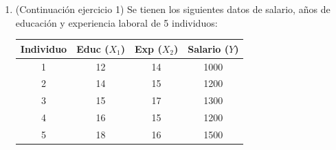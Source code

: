 \documentclass[10pt,a4paper]{article}
\begin{document}
\begin{enumerate}
    
$$\hat{colgpa} =1,392 -0,0135 hsperc + 0,0014 sat$$

Con $R^2=0,273$ y donde $colgpa$ es el promedio de las calificaciones de los estudiantes universitarios,
$hsperc$ es el percentil en la clase de educación media en la que se graduó (definida de manera que, por
ejemplo, $hsperc= 5$ significa el 5\% superior de su clase), y $sat$ son los puntajes combinados en
matemáticas y habilidades verbales en la prueba de admisión universitaria de los alumnos.
\begin{enumerate} 
\item (8 puntos) ¿Por qué es lógico que el coeficiente en $hsperc$ sea negativo?


\item  (8 puntos) ¿Cual es el promedio de calificaciones universitarias predicho cuando $hsperc= 20$ y $sat=900$?




\item (10 puntos) Suponga que dos estudiantes, A y B, se graduaron en el mismo percentil de la enseñanza media, pero el puntaje $sat$ del estudiante A es 140 puntos más alto. ¿Cuál es la diferencia predicha en el promedio
de calificaciones universitarias para estos dos alumnos? 



\item (10 puntos) Determine el $R^2$ ajustado ($\Bar{R^2}$) de la regresión. Compárelo con el $R^2$ y explique.



\item (20 puntos) Considerando que:

\[(X^\top X)^{-1} =
\begin{bmatrix}
8,5 & 0,19 & -0,11 \\
0,19 & 0,5 & -0,02 \\
-0,11 & -0,02 & 0,04 \\
\end{bmatrix}
\]

$$ \sum_{i=1}^{n} (y_i - \bar{y})^2=6.800$$
Determine la varianza de los estimadores de la regresión MCO.


\end{enumerate}


\item (Continuación ejercicio 1) Se tienen los siguientes datos de salario, años de educación y experiencia laboral de 5 individuos:
\begin{center}
\begin{tabular}{|c|c|c|c|}
\hline
\textbf{Individuo} & \textbf{Educ} ($X_1$) & \textbf{Exp} ($X_2$)  & \textbf{Salario ($Y$)}\\
\hline
1 & 12 & 14 & 1000 \\
2 & 14 & 15 & 1200 \\
3 & 15 & 17 & 1300 \\
4 & 16 & 15 & 1200 \\
5 & 18 & 16 & 1500 \\
\hline
\end{tabular}
\end{center}


\end{enumerate}
\end{document}
